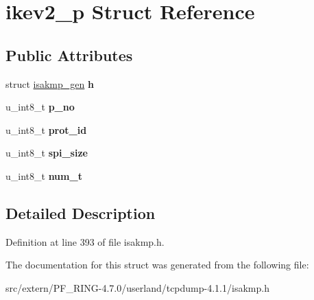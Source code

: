 \hypertarget{structikev2__p}{
\section{ikev2\_\-p Struct Reference}
\label{structikev2__p}
}
\subsection*{Public Attributes}
\begin{DoxyCompactItemize}
\item 
\hypertarget{structikev2__p_a1a42a2795f5eb8fd37c5d8716ba19e41}{
struct \hyperlink{structisakmp__gen}{isakmp\_\-gen} {\bfseries h}}
\label{structikev2__p_a1a42a2795f5eb8fd37c5d8716ba19e41}

\item 
\hypertarget{structikev2__p_a903ce5b58794b8f63400fc4a5957f854}{
u\_\-int8\_\-t {\bfseries p\_\-no}}
\label{structikev2__p_a903ce5b58794b8f63400fc4a5957f854}

\item 
\hypertarget{structikev2__p_a392168f6c145597748642ef76000764e}{
u\_\-int8\_\-t {\bfseries prot\_\-id}}
\label{structikev2__p_a392168f6c145597748642ef76000764e}

\item 
\hypertarget{structikev2__p_aaefc48e4534264f5828550daa0b0aa74}{
u\_\-int8\_\-t {\bfseries spi\_\-size}}
\label{structikev2__p_aaefc48e4534264f5828550daa0b0aa74}

\item 
\hypertarget{structikev2__p_ae0382925f7eea96cc0ee44b0e7a0171e}{
u\_\-int8\_\-t {\bfseries num\_\-t}}
\label{structikev2__p_ae0382925f7eea96cc0ee44b0e7a0171e}

\end{DoxyCompactItemize}


\subsection{Detailed Description}


Definition at line 393 of file isakmp.h.



The documentation for this struct was generated from the following file:\begin{DoxyCompactItemize}
\item 
src/extern/PF\_\-RING-\/4.7.0/userland/tcpdump-\/4.1.1/isakmp.h\end{DoxyCompactItemize}
